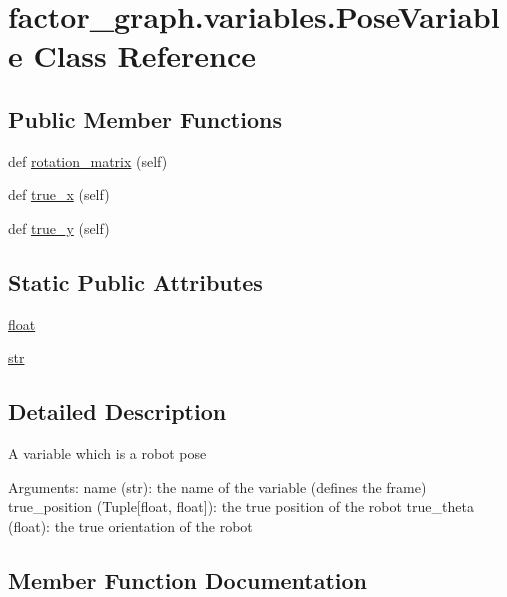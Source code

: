 \hypertarget{classfactor__graph_1_1variables_1_1PoseVariable}{}\section{factor\+\_\+graph.\+variables.\+Pose\+Variable Class Reference}
\label{classfactor__graph_1_1variables_1_1PoseVariable}
\subsection*{Public Member Functions}
\begin{DoxyCompactItemize}
\item
def \hyperlink{classfactor__graph_1_1variables_1_1PoseVariable_a396805d53fa8fcf8b616495a66dc8834}{rotation\+\_\+matrix} (self)
\item
def \hyperlink{classfactor__graph_1_1variables_1_1PoseVariable_a624276d0205478b18fc8d5fc403ff9b7}{true\+\_\+x} (self)
\item
def \hyperlink{classfactor__graph_1_1variables_1_1PoseVariable_a297788eb062c6eb834066a43c8411fcf}{true\+\_\+y} (self)
\end{DoxyCompactItemize}
\subsection*{Static Public Attributes}
\begin{DoxyCompactItemize}
\item
\hyperlink{classfactor__graph_1_1variables_1_1PoseVariable_a03f74713373c0ae495ec8b9a0c59319a}{float}
\item
\hyperlink{classfactor__graph_1_1variables_1_1PoseVariable_ae2be3699b81a1b8ec4c3e5e471297225}{str}
\end{DoxyCompactItemize}


\subsection{Detailed Description}
\begin{DoxyVerb}A variable which is a robot pose

Arguments:
    name (str): the name of the variable (defines the frame)
    true_position (Tuple[float, float]): the true position of the robot
    true_theta (float): the true orientation of the robot
\end{DoxyVerb}


\subsection{Member Function Documentation}
\mbox{\label{classfactor__graph_1_1variables_1_1PoseVariable_a396805d53fa8fcf8b616495a66dc8834}}

